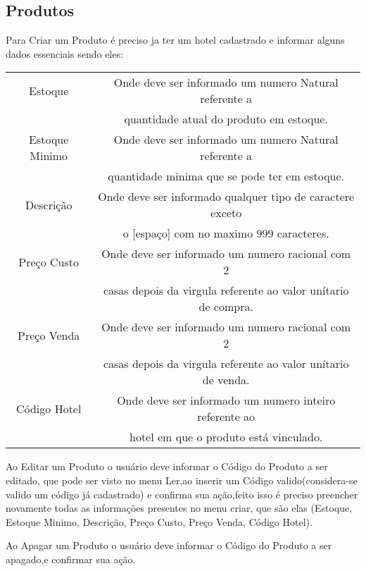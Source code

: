 \documentclass[titlepage]{article}
\begin{document}
				\subsection{Produtos}
				Para Criar um Produto é preciso ja ter um hotel cadastrado e informar alguns dados essenciais sendo eles:
				\begin{table}[h]%
					\begin{tabular}{|c|c|}
					\hline
					Estoque  & Onde deve ser informado um numero Natural referente a \\& quantidade atual do produto em estoque.\\
					\hline
					Estoque Minimo  & Onde deve ser informado um numero  Natural  referente a \\& quantidade minima que se pode ter em estoque.\\
					\hline
					Descrição  & Onde deve ser informado qualquer tipo de caractere exceto \\& o [espaço] com no maximo 999 caracteres.\\
					\hline
					Preço Custo  & Onde deve ser informado um numero racional com 2 \\& casas depois da virgula referente ao valor unítario de compra.\\
					\hline
					Preço Venda  & Onde deve ser informado um numero racional com 2 \\& casas depois da virgula referente ao valor unítario de venda.\\
					\hline
					Código Hotel  & Onde deve ser informado um numero inteiro referente ao \\& hotel em que o produto está vinculado.\\
					\hline
					\end{tabular}
				\end{table}

				Ao Editar um Produto o usuário deve informar o Código do Produto a ser editado, que pode ser visto no menu Ler,ao inserir um Código valido(considera-se valido um código já cadastrado) e confirma sua ação,feito isso é preciso preencher novamente todas as informações presentes no menu criar, que são elas (Estoque, Estoque Minimo, Descrição, Preço Custo, Preço Venda, Código Hotel).

				Ao Apagar um Produto o usuário deve informar o Código do Produto a ser apagado,e confirmar sua ação. 


				\newpage
\end{document}
